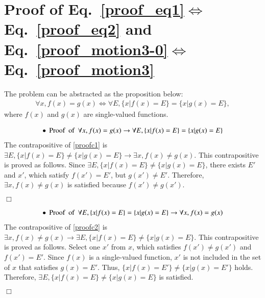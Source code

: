 \documentclass[preprint,
bibnotes,
 amsmath,amssymb,
 aps,
]{revtex4-1}
\begin{document}
\section{Proof of Eq.~\eqref{proof_eq1}$\Leftrightarrow$Eq.~\eqref{proof_eq2} and Eq.~\eqref{proof_motion3-0}$\Leftrightarrow$Eq.~\eqref{proof_motion3}}
\label{appendix1}
The problem can be abstracted as the proposition below: 
\begin{eqnarray}
\forall x, f(x) = g(x) \Leftrightarrow \forall E, \{x | f(x) = E\} = \{x | g(x) = E\},
\end{eqnarray}
where $f(x)$ and $g(x)$ are single-valued functions. \par
\begin{eqnarray}
\label{proofc1}
\bullet\:\:{\rm Proof\:\:of\:\:} \forall x, f(x) = g(x) \rightarrow  \forall E, \{x | f(x) = E\} = \{x | g(x) = E\} 
\end{eqnarray}
The contrapositive of \eqref{proofc1} is $\exists E, \{x | f(x) = E\} \neq \{x | g(x) = E\} \rightarrow  \exists x, f(x) \neq g(x) $. This contrapositive is proved as follows. Since $ \exists E, \{x | f(x) = E\} \neq \{x | g(x) = E\} $, there exists $E'$ and $x'$, which satisfy $f(x')=E'$, but $g(x') \neq E'$. 
Therefore, $\exists x, f(x) \neq g(x) $ is satisfied because $f(x') \neq g(x')$.\par
\begin{flushright}
$\Box$
\end{flushright}\par
\begin{eqnarray}
\label{proofc2}
\bullet\:\:{\rm Proof\:\:of\:\:} \forall E, \{x | f(x) = E\} = \{x | g(x) = E\} \rightarrow \forall x, f(x) = g(x) 
\end{eqnarray}
The contrapositive of \eqref{proofc2} is $\exists x, f(x) \neq g(x) \rightarrow  \exists E, \{x | f(x) = E\} \neq \{x | g(x) = E\}$. This contrapositive is proved as follows. Select one $x'$ from $x$, which satisfies $f(x') \neq g(x')$ and $f(x')=E'$. Since $f(x)$ is a single-valued function, $x'$ is not included in the set of $x$ that satisfies $g(x)=E'$. Thus, $\{x | f(x) = E'\} \neq \{x | g(x) = E'\} $ holds. Therefore, $\exists E, \{x | f(x) = E\} \neq \{x | g(x) = E\}$ is satisfied.\par
\begin{flushright}
$\Box$
\end{flushright}\par
\end{document}
